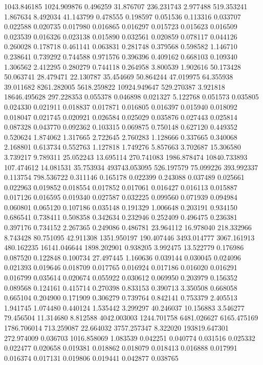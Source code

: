 1043.846185
1024.909876
0.496259
31.876707
236.231743
2.977488
519.353241
1.867634
8.492034
41.143799
0.478555
0.198597
0.051536
0.113316
0.033707
0.022588
0.020735
0.017980
0.016865
0.016297
0.015723
0.015623
0.016509
0.023539
0.016326
0.023138
0.015890
0.032561
0.020859
0.078117
0.044126
0.260028
0.178718
0.461141
0.063831
0.281748
0.379568
0.598582
1.146710
0.238641
0.739292
0.744588
0.971576
0.396396
0.409162
0.668103
0.109340
1.306562
2.412295
0.280279
0.744118
0.264958
3.800539
1.902616
50.173428
50.063741
28.479471
22.130787
35.454669
50.864244
47.019975
64.355938
39.011682
8261.282005
5618.259822
10924.949647
529.270387
3.921818
18646.495628
297.228353
0.055378
0.046898
0.021327
5.122768
0.051573
0.035805
0.024330
0.021911
0.018837
0.017871
0.016805
0.016397
0.015940
0.018092
0.018047
0.021745
0.020921
0.026584
0.025029
0.035876
0.027443
0.025814
0.087328
0.043770
0.092362
0.103315
0.069875
0.750148
0.627120
0.449352
0.520624
1.874062
1.317665
2.722645
2.760283
1.128666
0.337665
0.340068
2.168801
0.613734
0.552763
1.127818
1.749276
5.857663
3.702687
15.306580
3.739217
9.789311
25.052243
13.695114
270.741083
1986.878474
10840.733893
107.474612
14.081531
35.753934
493743.053095
526.197579
75.099226
393.992337
0.113754
798.536722
0.311146
0.165178
0.022399
0.243088
0.037489
0.025661
0.022963
0.019852
0.018554
0.017852
0.017061
0.016427
0.016113
0.015887
0.017126
0.016595
0.019340
0.027587
0.032225
0.099560
0.071939
0.094984
0.060801
0.065120
0.107186
0.035148
0.191329
1.006648
0.203191
0.934150
0.686541
0.738411
0.508358
0.342634
0.232946
0.252409
0.496475
0.236381
0.397176
0.734152
2.267365
0.249086
0.486781
23.964112
16.978040
218.332966
8.743428
80.751095
42.911308
1351.950197
190.407446
3493.014777
3067.161913
480.162235
16141.046644
1898.202901
0.938205
3.992475
13.522779
0.176986
0.087520
0.122848
0.100734
27.497445
1.160636
0.039144
0.030045
0.024096
0.021393
0.019646
0.018709
0.017765
0.016924
0.017186
0.016020
0.016291
0.016799
0.035614
0.020674
0.055922
0.030612
0.069950
0.203979
0.156352
0.089568
0.124161
0.415714
0.270398
0.833153
0.390713
3.350508
0.668058
0.665104
0.204900
0.171909
0.306279
0.739764
0.842141
0.753379
2.405513
1.941745
1.074480
0.440124
1.535442
3.299297
40.246037
10.156883
3.546277
79.456504
11.314680
8.812588
4042.003003
1244.701758
6481.026627
6165.475169
1786.706014
713.259087
22.664032
3757.257347
8.322020
193819.647301
272.974009
0.036703
1016.858069
1.083539
0.042251
0.040774
0.031516
0.025332
0.022477
0.020658
0.019381
0.018862
0.018079
0.018413
0.016888
0.017991
0.016374
0.017131
0.019806
0.019441
0.042877
0.038765
